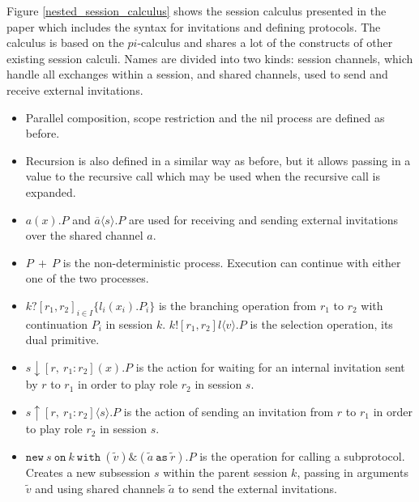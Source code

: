 \documentclass[12pt,twoside]{report}
\begin{document}
Figure \ref{nested_session_calculus} shows the session calculus presented in the paper which includes the syntax for invitations and defining protocols. The calculus is based on the $pi$-calculus and shares a lot of the constructs of other existing session calculi\cite{logicaassertions}. Names are divided into two kinds: session channels, which handle all exchanges within a session, and shared channels, used to send and receive external invitations. 
\begin{itemize}
    \item Parallel composition, scope restriction and the nil process are defined as before.
    \item Recursion is also defined in a similar way as before, but it allows passing in a value to the recursive call which may be used when the recursive call is expanded. 
    \item $a(x).P$ and $\overline{a}\langle s \rangle.P$ are used for receiving and sending external invitations over the shared channel $a$.
    \item $P\ +\ P$ is the non-deterministic process. Execution can continue with either one of the two processes.
    \item $k?[r_1, r_2]_{i \in I} \{l_i(x_i).P_i\}$ is the branching operation from $r_1$ to $r_2$ with continuation $P_i$ in session $k$. $k![r_1, r_2]l \langle v \rangle.P$ is the selection operation, its dual primitive. 
    \item $s \downarrow [r,\ r_1 : r_2](x).P$ is the action for waiting for an internal invitation sent by $r$ to $r_1$ in order to play role $r_2$ in session $s$. 
    \item $s \uparrow [r,\ r_1 : r_2]\langle s \rangle.P$ is the action of sending an invitation from $r$ to $r_1$ in order to play role $r_2$ in session $s$.
    \item $\texttt{new}\ s\ \texttt{on}\ k\ \texttt{with}\ (\widetilde{v})\&(\widetilde{a}\ \texttt{as}\ \widetilde{r}).P$ is the operation for calling a subprotocol. Creates a new subsession $s$ within the parent session $k$, passing in arguments $\widetilde{v}$ and using shared channels $\widetilde{a}$ to send the external invitations.
\end{itemize}
\end{document}
